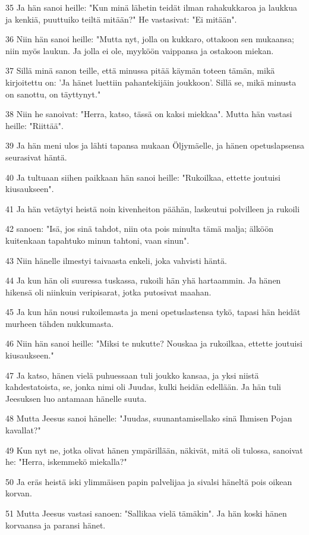 \par 35 Ja hän sanoi heille: "Kun minä lähetin teidät ilman rahakukkaroa ja laukkua ja kenkiä, puuttuiko teiltä mitään?" He vastasivat: "Ei mitään".
\par 36 Niin hän sanoi heille: "Mutta nyt, jolla on kukkaro, ottakoon sen mukaansa; niin myös laukun. Ja jolla ei ole, myyköön vaippansa ja ostakoon miekan.
\par 37 Sillä minä sanon teille, että minussa pitää käymän toteen tämän, mikä kirjoitettu on: 'Ja hänet luettiin pahantekijäin joukkoon'. Sillä se, mikä minusta on sanottu, on täyttynyt."
\par 38 Niin he sanoivat: "Herra, katso, tässä on kaksi miekkaa". Mutta hän vastasi heille: "Riittää".
\par 39 Ja hän meni ulos ja lähti tapansa mukaan Öljymäelle, ja hänen opetuslapsensa seurasivat häntä.
\par 40 Ja tultuaan siihen paikkaan hän sanoi heille: "Rukoilkaa, ettette joutuisi kiusaukseen".
\par 41 Ja hän vetäytyi heistä noin kivenheiton päähän, laskeutui polvilleen ja rukoili
\par 42 sanoen: "Isä, jos sinä tahdot, niin ota pois minulta tämä malja; älköön kuitenkaan tapahtuko minun tahtoni, vaan sinun".
\par 43 Niin hänelle ilmestyi taivaasta enkeli, joka vahvisti häntä.
\par 44 Ja kun hän oli suuressa tuskassa, rukoili hän yhä hartaammin. Ja hänen hikensä oli niinkuin veripisarat, jotka putosivat maahan.
\par 45 Ja kun hän nousi rukoilemasta ja meni opetuslastensa tykö, tapasi hän heidät murheen tähden nukkumasta.
\par 46 Niin hän sanoi heille: "Miksi te nukutte? Nouskaa ja rukoilkaa, ettette joutuisi kiusaukseen."
\par 47 Ja katso, hänen vielä puhuessaan tuli joukko kansaa, ja yksi niistä kahdestatoista, se, jonka nimi oli Juudas, kulki heidän edellään. Ja hän tuli Jeesuksen luo antamaan hänelle suuta.
\par 48 Mutta Jeesus sanoi hänelle: "Juudas, suunantamisellako sinä Ihmisen Pojan kavallat?"
\par 49 Kun nyt ne, jotka olivat hänen ympärillään, näkivät, mitä oli tulossa, sanoivat he: "Herra, iskemmekö miekalla?"
\par 50 Ja eräs heistä iski ylimmäisen papin palvelijaa ja sivalsi häneltä pois oikean korvan.
\par 51 Mutta Jeesus vastasi sanoen: "Sallikaa vielä tämäkin". Ja hän koski hänen korvaansa ja paransi hänet.
